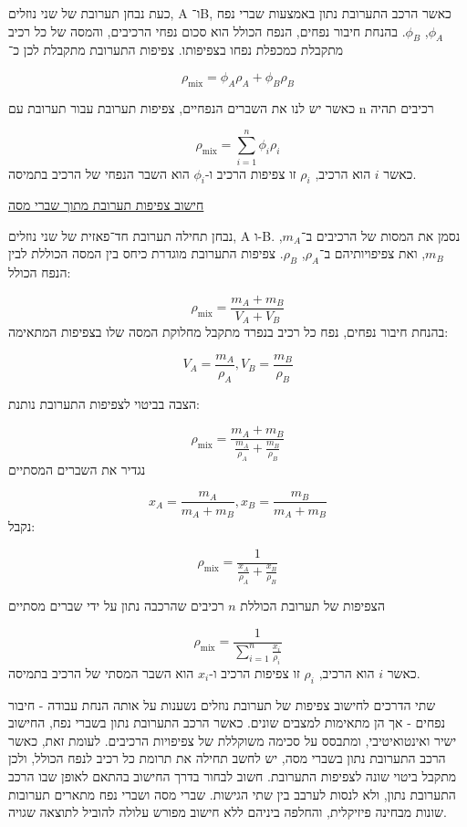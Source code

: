 \documentclass[
  hebrew,
  letterpaper,
  DIV=11,
  numbers=noendperiod]{scrreprt}
\begin{document}
כעת נבחן תערובת של שני נוזלים, A ו־B, כאשר הרכב התערובת נתון באמצעות
שברי נפח \(\phi_{A}\), \(\phi_{B}\). בהנחת חיבור נפחים, הנפח הכולל הוא
סכום נפחי הרכיבים, והמסה של כל רכיב מתקבלת כמכפלת נפחו בצפיפותו. צפיפות
התערובת מתקבלת לכן כ־

\[\rho_{\text{mix}} = \phi_{A}\rho_{A} + \phi_{B}\rho_{B}\]

כאשר יש לנו את השברים הנפחיים, צפיפות תערובת עבור תערובת עם n רכיבים
תהיה

\[\rho_{\text{mix}} = \sum_{i = 1}^{n}\phi_{i}\rho_{i}\] כאשר \(i\) הוא
הרכיב, \(\rho_{i}\) זו צפיפות הרכיב ו-\(\phi_{i}\) הוא השבר הנפחי של
הרכיב בתמיסה.

\ul{חישוב צפיפות תערובת מתוך שברי מסה}

נבחן תחילה תערובת חד־פאזית של שני נוזלים, A ו-B. נסמן את המסות של
הרכיבים ב־\(m_{A}\), \(m_{B}\), ואת צפיפויותיהם ב־\(\rho_{A}\),
\(\rho_{B}\). צפיפות התערובת מוגדרת כיחס בין המסה הכוללת לבין הנפח
הכולל:

\[\rho_{\text{mix}} = \frac{m_{A} + m_{B}}{V_{A} + V_{B}}\] בהנחת חיבור
נפחים, נפח כל רכיב בנפרד מתקבל מחלוקת המסה שלו בצפיפות המתאימה:

\[V_{A} = \frac{m_{A}}{\rho_{A}},V_{B} = \frac{m_{B}}{\rho_{B}}\]

הצבה בביטוי לצפיפות התערובת נותנת:

\[\rho_{\text{mix}} = \frac{m_{A} + m_{B}}{\frac{m_{A}}{\rho_{A}} + \frac{m_{B}}{\rho_{B}}}\]
נגדיר את השברים המסתיים

\[x_{A} = \frac{m_{A}}{m_{A} + m_{B}},x_{B} = \frac{m_{B}}{m_{A} + m_{B}}\]
נקבל:

\[\rho_{\text{mix}} = \frac{1}{\frac{x_{A}}{\rho_{A}} + \frac{x_{B}}{\rho_{B}}}\]

הצפיפות של תערובת הכוללת \(n\) רכיבים שהרכבה נתון על ידי שברים מסתיים

\[\rho_{\text{mix}} = \frac{1}{\sum_{i = 1}^{n}\frac{x_{i}}{\rho_{i}}}\]
כאשר \(i\) הוא הרכיב, \(\rho_{i}\) זו צפיפות הרכיב ו-\(x_{i}\) הוא השבר
המסתי של הרכיב בתמיסה.

שתי הדרכים לחישוב צפיפות של תערובת נוזלים נשענות על אותה הנחת עבודה -
חיבור נפחים - אך הן מתאימות למצבים שונים. כאשר הרכב התערובת נתון בשברי
נפח, החישוב ישיר ואינטואיטיבי, ומתבסס על סכימה משוקללת של צפיפויות
הרכיבים. לעומת זאת, כאשר הרכב התערובת נתון בשברי מסה, יש לחשב תחילה את
תרומת כל רכיב לנפח הכולל, ולכן מתקבל ביטוי שונה לצפיפות התערובת. חשוב
לבחור בדרך החישוב בהתאם לאופן שבו הרכב התערובת נתון, ולא לנסות לערבב בין
שתי הגישות. שברי מסה ושברי נפח מתארים תערובות שונות מבחינה פיזיקלית,
והחלפה ביניהם ללא חישוב מפורש עלולה להוביל לתוצאה שגויה.
\end{document}
